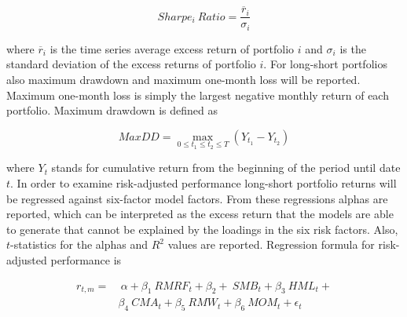 \documentclass[12pt]{article}
\begin{document}
\begin{equation}
\label{eq:SharpeRatio}
Sharpe_i \ Ratio = \frac{\overline{r}_i}{\sigma_i}
\end{equation}

where $\overline{r}_i$ is the time series average excess return of portfolio $i$ and $\sigma_i$ is the standard deviation of the excess returns of portfolio $i$. For long-short portfolios also maximum drawdown and maximum one-month loss will be reported. Maximum one-month loss is simply the largest negative monthly return of each portfolio. Maximum drawdown is defined as \par

\begin{equation}
\label{eq:maxDD}
MaxDD = \max\limits_{0\leq t_1\leq t_2\leq T} (Y_{t_1} - Y_{t_2})
\end{equation}

where $Y_t$ stands for cumulative return from the beginning of the period until date $t$. In order to examine risk-adjusted performance long-short portfolio returns will be regressed against \citet{FAMA20151} six-factor model factors.\footnotemark {} From these regressions alphas are reported, which can be interpreted as the excess return that the models are able to generate that cannot be explained by the loadings in the six risk factors. Also, $t$-statistics for the alphas and $R^2$ values are reported. Regression formula for risk-adjusted performance is \par

\begin{equation}
\label{eq:FFRegFormula}
\begin{split}
r_{t, m} = 	& \ \alpha+ \beta_{1} \ RMRF_{t} + \beta_{2} + \ SMB_{t} + \beta_{3} \ HML_{t} + \\
		&  \beta_{4} \ CMA_{t} +  \beta_{5} \ RMW_{t} + \beta_{6} \ MOM_{t} + \epsilon_{t}
\end{split}
\end{equation}
\end{document}
